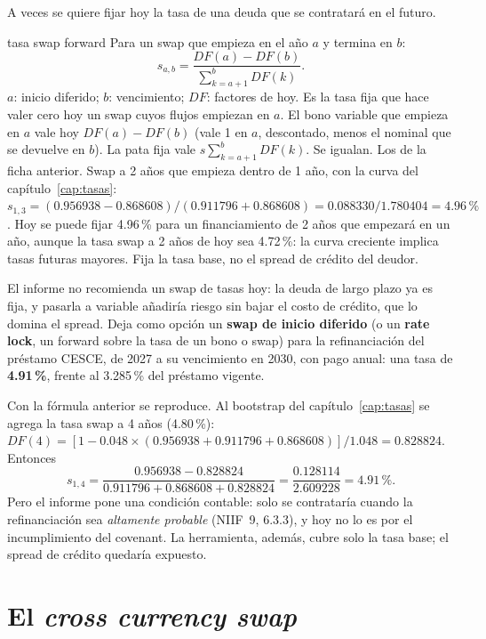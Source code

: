 A veces se quiere fijar hoy la tasa de una deuda que se contratará en el futuro.

\begin{ficha}{tasa swap forward}
 Para un swap que empieza en el año $a$ y termina en $b$:
\[ s_{a,b}=\frac{DF(a)-DF(b)}{\sum_{k=a+1}^{b}DF(k)}. \]
 $a$: inicio diferido; $b$: vencimiento; $DF$: factores de hoy.
 Es la tasa fija que hace valer cero hoy un swap cuyos flujos empiezan en $a$.
 El bono variable que empieza en $a$ vale hoy $DF(a)-DF(b)$ (vale 1 en $a$, descontado, menos el nominal que se devuelve en $b$). La pata fija vale $s\sum_{k=a+1}^{b}DF(k)$. Se igualan.
 Los de la ficha anterior.
 Swap a 2 años que empieza dentro de 1 año, con la curva del capítulo~\ref{cap:tasas}: $s_{1,3}=(0.956938-0.868608)/(0.911796+0.868608)=0.088330/1.780404=4.96\,\%$.
 Hoy se puede fijar 4.96\,\% para un financiamiento de 2 años que empezará en un año, aunque la tasa swap a 2 años de hoy sea 4.72\,\%: la curva creciente implica tasas futuras mayores.
 Fija la tasa base, no el spread de crédito del deudor.
\end{ficha}

\begin{informe}
El informe no recomienda un swap de tasas hoy: la deuda de largo plazo ya es fija, y pasarla a variable añadiría riesgo sin bajar el costo de crédito, que lo domina el spread. Deja como opción un \textbf{swap de inicio diferido} (o un \textbf{rate lock}, un forward sobre la tasa de un bono o swap) para la refinanciación del préstamo CESCE, de 2027 a su vencimiento en 2030, con pago anual: una tasa de \textbf{4.91\,\%}, frente al 3.285\,\% del préstamo vigente.

Con la fórmula anterior se reproduce. Al bootstrap del capítulo~\ref{cap:tasas} se agrega la tasa swap a 4 años (4.80\,\%): $DF(4)=[1-0.048\times(0.956938+0.911796+0.868608)]/1.048=0.828824$. Entonces
\[ s_{1,4}=\frac{0.956938-0.828824}{0.911796+0.868608+0.828824}=\frac{0.128114}{2.609228}=4.91\,\%. \]
Pero el informe pone una condición contable: solo se contrataría cuando la refinanciación sea \emph{altamente probable} (NIIF~9, 6.3.3), y hoy no lo es por el incumplimiento del covenant. La herramienta, además, cubre solo la tasa base; el spread de crédito quedaría expuesto.
\end{informe}

\section{El \emph{cross currency swap}}

